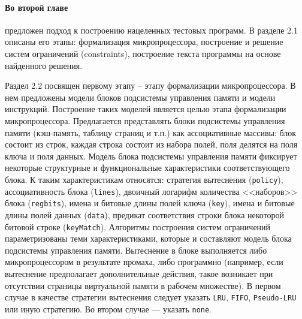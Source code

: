 \documentclass[14pt,autoref,href
,facsimile
]{disser}
\begin{document}
\paragraph{Во второй главе} предложен подход к построению нацеленных тестовых программ. В разделе 2.1 описаны его этапы: формализация микропроцессора, построение и решение систем ограничений (constraints), построение текста программы на основе найденного решения.

Раздел 2.2 посвящен первому этапу -- этапу формализации микропроцессора. В нем предложены модели блоков подсистемы управления памяти и модели инструкций. Построение таких моделей является целью этапа формализации микропроцессора. Предлагается представлять блоки подсистемы управления памяти (кэш-память, таблицу страниц и т.п.) как ассоциативные массивы: блок состоит из строк, каждая строка состоит из набора полей, поля делятся на поля ключа и поля данных. Модель блока подсистемы управления памяти фиксирует некоторые структурные и функциональные характеристики соответствующего блока. К таким характеристикам относятся: стратегия вытеснения (\texttt{policy}), ассоциативность блока (\texttt{lines}), двоичный логарифм количества <<наборов>> блока (\texttt{regbits}), имена и битовые длины полей ключа (\texttt{key}), имена и битовые длины полей данных (\texttt{data}), предикат соответствия строки блока некоторой битовой строке (\texttt{keyMatch}). Алгоритмы построения систем ограничений параметризованы теми характеристиками, которые и составляют модель блока подсистемы управления памяти. Вытеснение в блоке выполняется либо микропроцессором в результате промаха, либо программно (например, если вытеснение предполагает дополнительные действия, такое возникает при отсутствии страницы виртуальной памяти в рабочем множестве). В первом случае в качестве стратегии вытеснения следует указать \texttt{LRU}, \texttt{FIFO}, \texttt{Pseudo-LRU} или иную стратегию. Во втором случае --- указать \texttt{none}.
\end{document}
